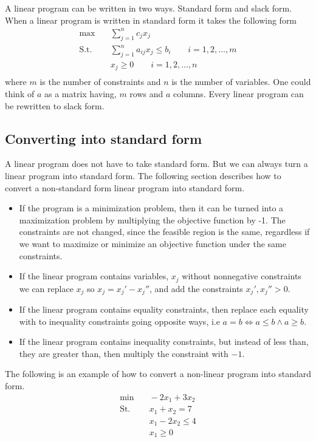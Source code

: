 \documentclass[10pt]{article}
\begin{document}
A linear program can be written in two ways. Standard form and slack form. When a linear program is written in standard form it takes the following form
\begin{align*}
\max &\quad \sum_{j=1}^n c_jx_j  \\ 
 \text{S.t.} &\quad \sum_{j=1}^n a_{ij}x_j \leq b_i \qquad i=1,2,\ldots,m\\
             &\quad x_j \geq 0 \qquad i=1,2,\ldots,n\\
\end{align*}
where $m$ is the number of constraints and $n$ is the number of variables. One could think of $a$ as a matrix having, $m$ rows and $a$ columns. Every linear program can be rewritten to slack form. 

\subsection{Converting into standard form} %
\label{sub:converting_into_standard_form}
A linear program does not have to take standard form. But we can always turn a linear program into standard form. The following section describes how to convert a non-standard form linear program into standard form.

\begin{itemize}
  \item If the program is a minimization problem, then it can be turned into a maximization problem by multiplying the objective function by -1. The constraints are not changed, since the feasible region is the same, regardless if we want to maximize or minimize an objective function under the same constraints.                                                                         
  \item If the linear program contains variables, $x_j$ without nonnegative constraints we can replace $x_j$ so $x_j = x_j'-x_j''$, and add the constraints $x_j', x_j''>0$.
  \item If the linear program contains equality constraints, then replace each equality with to inequality constraints going opposite ways, i.e $a = b \Leftrightarrow a \leq b \wedge a \geq b$. 
  \item If the linear program contains inequality constraints, but instead of less than, they are greater than, then multiply the constraint with $-1$.
\end{itemize}

The following is an example of how to convert a non-linear program into standard form. 
\begin{align*}
 \min &\quad -2x_1 + 3x_2  \\ 
 \text{St.} &\quad  x_1 + x_2  = 7 \\
            &\quad  x_1 - 2x_2 \leq 4 \\
            &\quad  x_1        \geq 0  
\end{align*}
\end{document}

